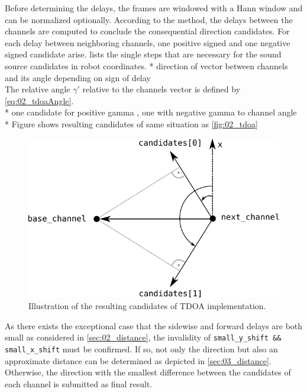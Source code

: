 Before determining the delays, the frames are windowed with a Hann window and can be
normalized optionally.
According to the method, the delays between the channels are computed to conclude the
consequential direction candidates.
For each delay between neighboring channels, one positive signed and one negative
signed candidate arise.
 lists the single steps that are necessary for the sound source
candidates in robot coordinates.
* direction of vector between channels and its angle depending on sign of delay\\
The relative angle $\gamma'$ relative to the channels vector is defined
by \cref{eq:02_tdoaAngle}.\\
* one candidate for positive gamma , one with negative gamma to channel angle\\
* Figure shows resulting candidates of same situation as \cref{fig:02_tdoa}
\begin{figure}[ht]
	\centering
		\includegraphics[width=0.6\columnwidth]{figures/tdoa_code}
	\caption{Illustration of the resulting candidates of \ac{TDOA} implementation.}
\end{figure}
\label{fig:03_tdoaCode}

As there exists the exceptional case that the sidewise and forward delays are both small
as considered in \cref{sec:02_distance}, the invalidity of
\lstinline!small_y_shift && small_x_shift! must be confirmed.
If so, not only the direction but also an approximate distance can be determined
as depicted in \cref{sec:03_distance}.
Otherwise, the direction with the smallest difference between the
candidates of each channel is submitted as final result.